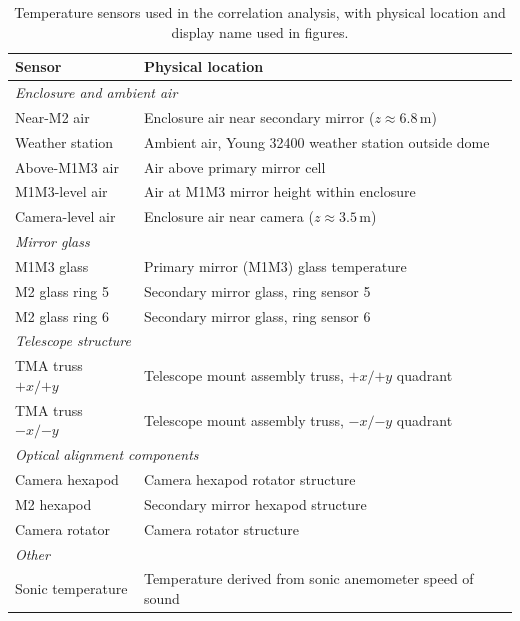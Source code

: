\documentclass[SE,authoryear,toc]{lsstdoc}
\begin{document}
\begin{table}[htbp]
\centering
\small
\caption{Temperature sensors used in the correlation analysis, with physical
         location and display name used in figures.}
\label{tab:key_sensors}
\begin{tabular}{l l}
\toprule
\textbf{Sensor} & \textbf{Physical location}\\
\midrule
\multicolumn{2}{l}{\textit{Enclosure and ambient air}} \\[2pt]
 Near-M2 air         & Enclosure air near secondary mirror ($z \approx 6.8$\,m)   \\[3pt]
Weather station     & Ambient air, Young 32400 weather station outside dome       \\[3pt]
Above-M1M3 air      & Air above primary mirror cell                              \\[3pt]
M1M3-level air      & Air at M1M3 mirror height within enclosure                 \\[3pt]
Camera-level air    & Enclosure air near camera ($z \approx 3.5$\,m)              \\[6pt]
\multicolumn{2}{l}{\textit{Mirror glass}} \\[2pt]
M1M3 glass         & Primary mirror (M1M3) glass temperature                     \\[3pt]
M2 glass ring 5     & Secondary mirror glass, ring sensor 5                      \\[3pt]
M2 glass ring 6     & Secondary mirror glass, ring sensor 6                      \\[6pt]
\multicolumn{2}{l}{\textit{Telescope structure}} \\[2pt]
TMA truss $+x/{+y}$   & Telescope mount assembly truss, $+x/{+y}$ quadrant            \\[3pt]
TMA truss $-x/{-y}$   & Telescope mount assembly truss, $-x/{-y}$ quadrant            \\[6pt]
\multicolumn{2}{l}{\textit{Optical alignment components}} \\[2pt]
Camera hexapod      & Camera hexapod rotator structure                           \\[3pt]
M2 hexapod          & Secondary mirror hexapod structure                          \\[3pt]
Camera rotator      & Camera rotator structure                                   \\[6pt]
\multicolumn{2}{l}{\textit{Other}} \\[2pt]
Sonic temperature   & Temperature derived from sonic anemometer speed of sound \\
\bottomrule
\end{tabular}
\end{table}
\end{document}

